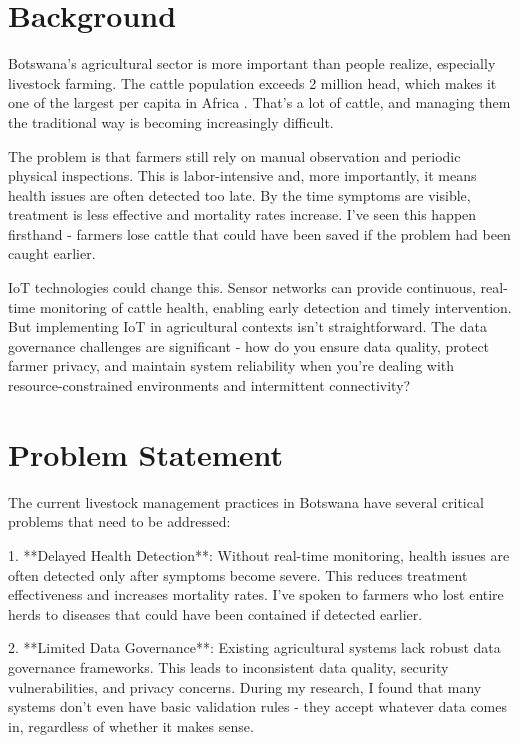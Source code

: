 
\section{Background}

Botswana's agricultural sector is more important than people realize, especially livestock farming. The cattle population exceeds 2 million head, which makes it one of the largest per capita in Africa \cite{botswana_agriculture_2023}. That's a lot of cattle, and managing them the traditional way is becoming increasingly difficult.

The problem is that farmers still rely on manual observation and periodic physical inspections. This is labor-intensive and, more importantly, it means health issues are often detected too late. By the time symptoms are visible, treatment is less effective and mortality rates increase. I've seen this happen firsthand - farmers lose cattle that could have been saved if the problem had been caught earlier.

IoT technologies could change this. Sensor networks can provide continuous, real-time monitoring of cattle health, enabling early detection and timely intervention. But implementing IoT in agricultural contexts isn't straightforward. The data governance challenges are significant - how do you ensure data quality, protect farmer privacy, and maintain system reliability when you're dealing with resource-constrained environments and intermittent connectivity?

\section{Problem Statement}

The current livestock management practices in Botswana have several critical problems that need to be addressed:

1. **Delayed Health Detection**: Without real-time monitoring, health issues are often detected only after symptoms become severe. This reduces treatment effectiveness and increases mortality rates. I've spoken to farmers who lost entire herds to diseases that could have been contained if detected earlier.

2. **Limited Data Governance**: Existing agricultural systems lack robust data governance frameworks. This leads to inconsistent data quality, security vulnerabilities, and privacy concerns. During my research, I found that many systems don't even have basic validation rules - they accept whatever data comes in, regardless of whether it makes sense.

